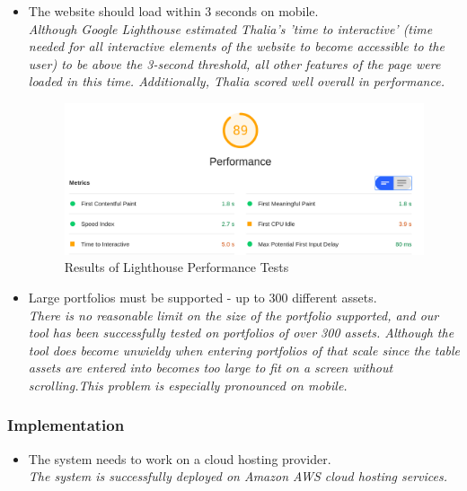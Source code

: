\documentclass[main.tex]{subfiles}
\begin{document}
\begin{itemize}
\item The website should load within 3 seconds on mobile.\\
\textit{Although Google Lighthouse estimated Thalia’s 'time to interactive' (time needed for all interactive elements of the website to become accessible to the user) to be above the 3-second threshold, all other features of the page were loaded in this time. Additionally, Thalia scored well overall in performance.}



\begin{figure}[H]
   \centering
   \includegraphics[scale=0.3]{07Evaluation/07Pictures/performanceLighthouse.png}
   \caption{Results of Lighthouse Performance Tests}
   \label{LighthousePerf}
\end{figure}



\item Large portfolios must be supported - up to 300 different assets.\\
\textit{There is no reasonable limit on the size of the portfolio supported, and our tool has been successfully tested on portfolios of over 300 assets. Although the tool does become unwieldy when entering portfolios of that scale since the table assets are entered into becomes too large to fit on a screen without scrolling.This problem is especially pronounced on mobile.}

\end{itemize}

\subsubsection{Implementation}
\begin{itemize}

\item The system needs to work on a cloud hosting provider.\\
\textit{The system is successfully deployed on Amazon AWS cloud hosting services.}

\end{itemize}
\end{document}
